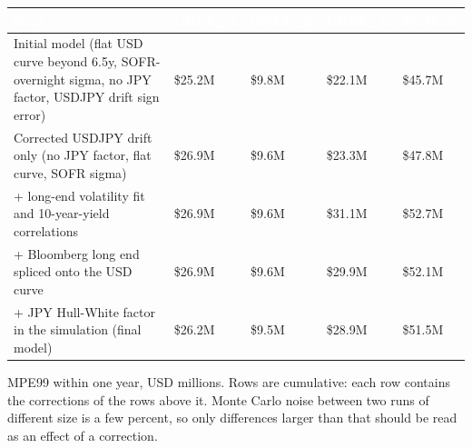 \documentclass[11pt,letterpaper]{article}
\begin{document}
{\scriptsize\setlength{\LTpre}{4pt}\setlength{\LTpost}{6pt}
\begin{longtable}{>{\raggedright\arraybackslash}p{}>{\raggedright\arraybackslash}p{}>{\raggedright\arraybackslash}p{}>{\raggedright\arraybackslash}p{}>{\raggedright\arraybackslash}p{}}
\toprule
\rowcolor{navy}\textbf{\textcolor{white}{Step}} & \textbf{\textcolor{white}{CPTY\_A}} & \textbf{\textcolor{white}{CPTY\_B}} & \textbf{\textcolor{white}{CPTY\_C}} & \textbf{\textcolor{white}{Portfolio}} \\
\endhead
Initial model (flat USD curve beyond 6.5y, SOFR-overnight sigma, no JPY factor, USDJPY drift sign error) & \$25.2M & \$9.8M & \$22.1M & \$45.7M \\
\rowcolor{gray!9}Corrected USDJPY drift only (no JPY factor, flat curve, SOFR sigma) & \$26.9M & \$9.6M & \$23.3M & \$47.8M \\
+ long-end volatility fit and 10-year-yield correlations & \$26.9M & \$9.6M & \$31.1M & \$52.7M \\
\rowcolor{gray!9}+ Bloomberg long end spliced onto the USD curve & \$26.9M & \$9.6M & \$29.9M & \$52.1M \\
+ JPY Hull-White factor in the simulation (final model) & \$26.2M & \$9.5M & \$28.9M & \$51.5M \\
\bottomrule
\end{longtable}}

{\small MPE99 within one year, USD millions. Rows are cumulative: each row contains the corrections of the rows above it. Monte Carlo noise between two runs of different size is a few percent, so only differences larger than that should be read as an effect of a correction.}
\end{document}
